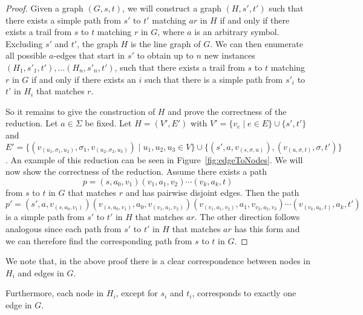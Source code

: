 \documentclass[a4paper,english]{lipics-v2016}
\theoremstyle{plain}
\begin{document}
		
		

\trailtopathfptreduction*
\begin{proof}
			Given a graph $(G,s,t)$, we will construct a graph $(H,s',t')$ such
	that there exists a simple path from $s'$ to $t'$ matching $a r$ in
	$H$ if and only if there exists a trail from $s$ to $t$ matching $r$
	in $G$, where $a$ is an arbitrary symbol. 
	Excluding $s'$ and $t'$, the graph $H$ is the line graph of $G$. 	We can then enumerate all possible $a$-edges that start in $s'$ to obtain up to $n$ new instances $(H_1,s'_1,t'), \ldots (H_n,s'_n,t')$, such that there exists a trail from $s$ to $t$ matching $r$ in $G$ if and only if there exists an $i$ such that there is a simple path from $s'_i$ to $t'$ in $H_i$ that matches $r$.
	
		So it remains to give the construction of $H$ and prove the correctness of the reduction. Let $a \in \Sigma$ be fixed. 
	Let $H=(V',E')$ with $V' = \{v_e \mid e \in E\}\cup \{s',t'\}$ and $E' = \{(v_{(u_1,\sigma_1,u_2)},\sigma_1,v_{(u_2,\sigma_2,u_3)})\mid u_1, u_2, u_3 \in V\} \cup \{(s',a ,v_{(s,\sigma,u)}), (v_{(u,\sigma,t)},\sigma,t') \}$. 
		An example of this reduction can be seen in Figure~\ref{fig:edgeToNodes}.
	We will now show the correctness of the reduction. Assume there exists a path $$p = (s,a_0,v_1)(v_1,a_1, v_2)\cdots (v_k,a_{k},t)$$ from $s$ to $t$ in $G$ that matches $r$ and has pairwise disjoint edges. Then the path $$p' = (s',a,v_{(s,a_0, v_1)})(v_{(s,a_0, v_1)},a_0,v_{(v_1,a_1, v_2)})(v_{(v_1,a_1, v_2)},a_1,v_{v_2,a_2,v_3})\cdots (v_{(v_k,a_k,t)},a_{k},t')$$ is a simple path from $s'$ to $t'$ in $H$ that matches $a r$. The other direction follows analogous since each path from $s'$ to $t'$ in $H$ that matches $a r$ has this form and we can therefore find the corresponding path from $s$ to $t$ in $G$.
\end{proof}

We note that, in the above proof there is a clear correspondence
between nodes in $H_i$ and edges in $G$.
\begin{corollary}
  Furthermore, each node in $H_i$, except for $s_i$ and $t_i$, corresponds to exactly one edge in $G$. 
\end{corollary}
\end{document}
